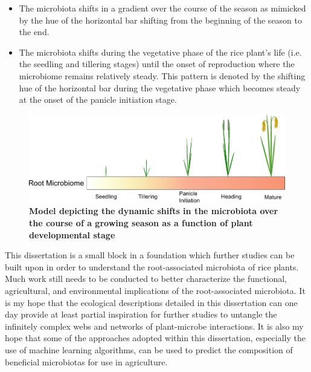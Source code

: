 \begin{itemize}
\item The microbiota shifts in a gradient over the course of the season as mimicked by the hue of the horizontal bar shifting from the beginning of the season to the end.
\item The microbiota shifts during the vegetative phase of the rice plant's life (i.e. the seedling and tillering stages) until the onset of reproduction where the microbiome remains relatively steady. This pattern is denoted by the shifting hue of the horizontal bar during the vegetative phase which becomes steady at the onset of the panicle initiation stage.
\end{itemize}

\begin{figure}[h]
\centering
\includegraphics[width=5in]{Figures/figurec_3}
\caption[Figure 5.3]{\textbf{Model depicting the dynamic shifts in the microbiota over the course of a growing season as a function of plant developmental stage}}
\label{Figure 5.3}
\end{figure}

This dissertation is a small block in a foundation which further studies can be built upon in order to understand the root-associated microbiota of rice plants. Much work still needs to be conducted to better characterize the functional, agricultural, and environmental implications of the root-associated microbiota. It is my hope that the ecological descriptions detailed in this dissertation can one day provide at least partial inspiration for further studies to untangle the infinitely complex webs and networks of plant-microbe interactions. It is also my hope that some of the approaches adopted within this dissertation, especially the use of machine learning algorithms, can be used to predict the composition of beneficial microbiotas for use in agriculture.